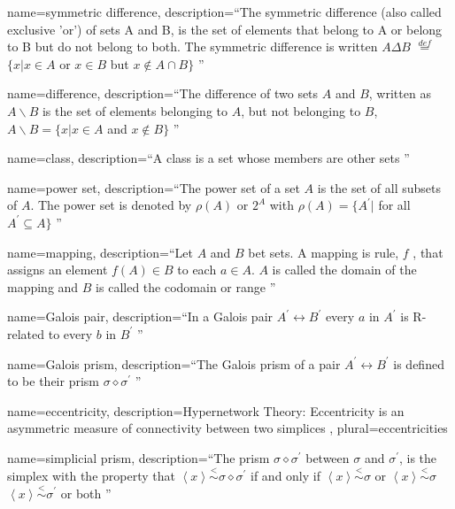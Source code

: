 {
  name=symmetric difference,
  description={``The symmetric difference (also called exclusive 'or') of sets A and B, is
  the set of elements that belong to A or belong to B but do not belong
  to both. The symmetric difference is written $A\Delta B$ $\overset{def}{=}$ $\{x\vert x\in A$ or $x\in B$ but $x\notin A\cap B\}$
\citep{johnson2013hypernetworks}''}
}

{
  name=difference,
  description={``The difference of two sets $A$ and $B$, written as $A\backslash B$ is the
set of elements belonging to $A$, but not belonging to $B$,  $A\backslash
B=\{x|x\in A$ and $x\notin B\}$ \citep{johnson2013hypernetworks}''}
}

{
  name=class,
  description={``A class is a set whose members are other sets \citep{johnson2013hypernetworks}''}
}

{
  name=power set,
  description={``The power set of a set $A$ is the set of all subsets of $A$. The power set is denoted by $\rho (A)$ or $2^{A}$ with $\rho (A)=\{A^{\prime }|$ for all $A^{\prime }\subseteq A\}
$ \citep{johnson2013hypernetworks}''}
}

{
  name=mapping,
  description={``Let $A$ and $B$ bet sets. A mapping is rule, $f$ , that assigns an element
$f(A)\in B$ to each $a\in A$. $A$ is called the domain of the mapping and $B$
is called the codomain or range \citep{johnson2013hypernetworks}''}
}

{
  name=Galois pair,
  description={``In a Galois pair $A^{\prime }\leftrightarrow B^{\prime }$ every $a$ in $A^{\prime }$ is
R-related to every $b$ in $B^{\prime }$ \citep{johnson2013hypernetworks}''}
}

{
  name=Galois prism,
  description={``The Galois prism of a pair $A^{\prime }\leftrightarrow B^{\prime }$ is defined to be their prism $\sigma \diamond \sigma ^{\prime }$ \citep{johnson2013hypernetworks}''}
}


{
  name=eccentricity,
  description={Hypernetwork Theory: Eccentricity is an asymmetric measure of connectivity between two simplices \citep{johnson2013hypernetworks}},
  plural={eccentricities}
}

{
  name=simplicial prism,
  description={``The prism $\sigma \diamond \sigma ^{\prime }$  between $\sigma $ and $\sigma
^{\prime }$, is the simplex with the property that $\left\langle
x\right\rangle \overset{<}{\sim}\sigma \diamond \sigma ^{\prime }$ if
and only if $\left\langle x\right\rangle \overset{<}{\sim}\sigma $ or $%
\left\langle x\right\rangle \overset{<}{\sim}\sigma $\  $\left\langle
x\right\rangle \overset{<}{\sim}\sigma ^{\prime }$ or both \citep{johnson2013hypernetworks}''}
}

